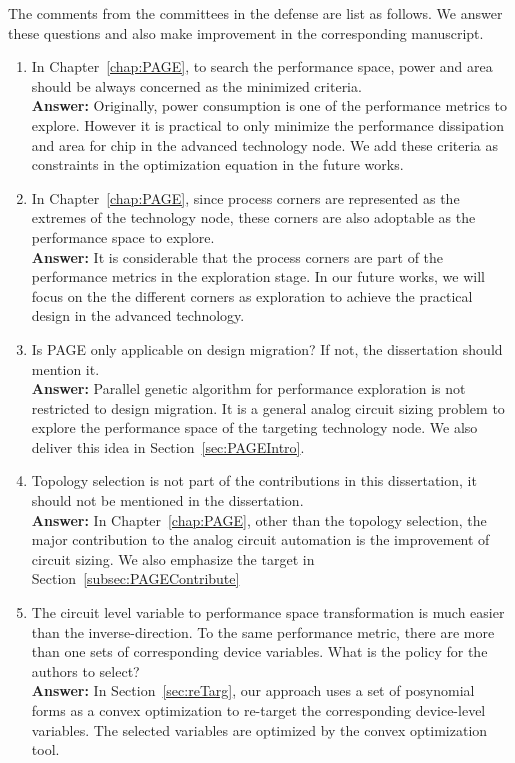 
The comments from the committees in the defense are list as follows. We answer these questions and also make improvement in the corresponding manuscript.
\begin{enumerate}
  \item In Chapter~\ref{chap:PAGE}, to search the performance space, power and area should be always concerned as the minimized criteria. \\
  {\bf Answer:} Originally, power consumption is one of the performance metrics to explore. However it is practical to only minimize the performance dissipation and area for chip in the advanced technology node. We add these criteria as constraints in the optimization equation in the future works. 
  \item In Chapter~\ref{chap:PAGE}, since process corners are represented as the extremes of the technology node, these corners are also adoptable as the performance space to explore. \\
  {\bf Answer:} It is considerable that the process corners are part of the performance metrics in the exploration stage. In our future works, we will focus on the the different corners as exploration to achieve the practical design in the advanced technology.
  \item Is PAGE only applicable on design migration? If not, the dissertation should mention it. \\
  {\bf Answer:} Parallel genetic algorithm for performance exploration is not restricted to design migration. It is a general analog circuit sizing problem to explore the performance space of the targeting technology node. We also deliver this idea in Section~\ref{sec:PAGEIntro}. 
  \item Topology selection is not part of the contributions in this dissertation, it should not be mentioned in the dissertation. \\
  {\bf Answer:} In Chapter~\ref{chap:PAGE}, other than the topology selection, the major contribution to the analog circuit automation is the improvement of circuit sizing. We also emphasize the target in Section~\ref{subsec:PAGEContribute}
  \item The circuit level variable to performance space transformation is much easier than the inverse-direction. To the same performance metric, there are more than one sets of corresponding device variables. What is the policy for the authors to select? \\
  {\bf Answer: }In Section~\ref{sec:reTarg}, our approach uses a set of posynomial forms as a convex optimization to re-target the corresponding device-level variables. The selected variables are optimized by the convex optimization tool. 

\end{enumerate}
